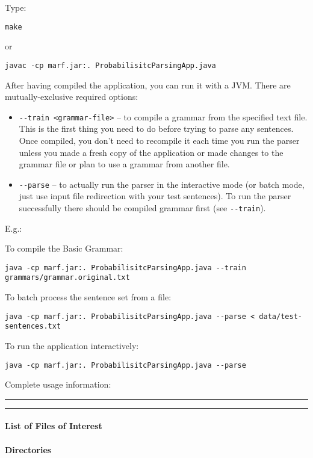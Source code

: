Type:

\noindent
\verb+make+

or

\noindent
\verb+javac -cp marf.jar:. ProbabilisitcParsingApp.java+

After having compiled the application, you can run it with a JVM.
There are mutually-exclusive required options:

\begin{itemize}

\item
\verb+--train <grammar-file>+ -- to compile a grammar from the specified text file.
This is the first thing you need to do before trying to parse any sentences. Once compiled,
you don't need to recompile it each time you run the parser unless you made a fresh
copy of the application or made changes to the grammar file or plan to use a grammar
from another file.

\item
\verb+--parse+ -- to actually run the parser in the interactive mode (or batch mode, just use
input file redirection with your test sentences). To run the parser successfully there should
be compiled grammar first (see \verb+--train+).

\end{itemize}

E.g.:

To compile the Basic Grammar:

\verb+java -cp marf.jar:. ProbabilisitcParsingApp.java --train grammars/grammar.original.txt+

To batch process the sentence set from a file:

\verb+java -cp marf.jar:. ProbabilisitcParsingApp.java --parse < data/test-sentences.txt+

To run the application interactively:

\verb+java -cp marf.jar:. ProbabilisitcParsingApp.java --parse+

\noindent
Complete usage information:

\vspace{15pt}
\hrule

\hrule
\vspace{15pt}


\paragraph{List of Files of Interest}

\paragraph*{Directories}

